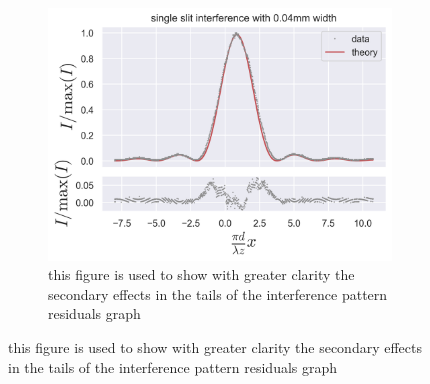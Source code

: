 \begin{figure}[H]
\begin{subfigure}{0.5\columnwidth}
        \centering
        \includegraphics[width=\columnwidth]{figures/single slit interference with 0.04mm not best fit but better tails.png}
        \caption{this figure is used to show with greater clarity the secondary effects in the tails of the interference pattern residuals graph}
        \label{fig:single slit interference with 0.04mm not best fit but better tails}
    \end{subfigure}
    \label{fig:single slit examples}
\end{figure}
